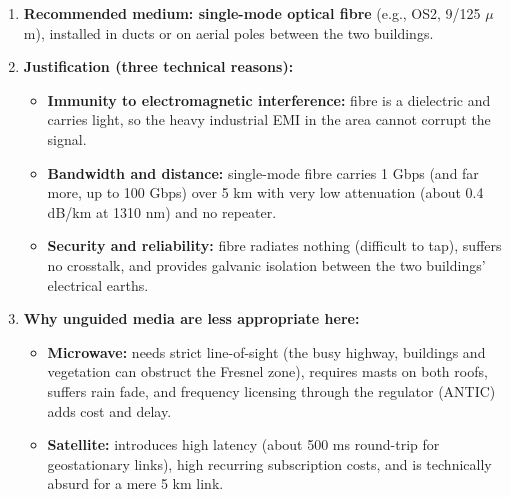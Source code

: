 \documentclass[11pt]{article}
\begin{document}
\begin{corrige}
\begin{enumerate}
\item \textbf{Recommended medium: single-mode optical fibre} (e.g., OS2, 9/125 $\mu$m), installed in ducts or on aerial poles between the two buildings.
\item \textbf{Justification (three technical reasons):}
\begin{itemize}
\item \textbf{Immunity to electromagnetic interference:} fibre is a dielectric and carries light, so the heavy industrial EMI in the area cannot corrupt the signal.
\item \textbf{Bandwidth and distance:} single-mode fibre carries 1 Gbps (and far more, up to 100 Gbps) over 5 km with very low attenuation (about 0.4 dB/km at 1310 nm) and no repeater.
\item \textbf{Security and reliability:} fibre radiates nothing (difficult to tap), suffers no crosstalk, and provides galvanic isolation between the two buildings' electrical earths.
\end{itemize}
\item \textbf{Why unguided media are less appropriate here:}
\begin{itemize}
\item \textbf{Microwave:} needs strict line-of-sight (the busy highway, buildings and vegetation can obstruct the Fresnel zone), requires masts on both roofs, suffers rain fade, and frequency licensing through the regulator (ANTIC) adds cost and delay.
\item \textbf{Satellite:} introduces high latency (about 500 ms round-trip for geostationary links), high recurring subscription costs, and is technically absurd for a mere 5 km link.
\end{itemize}
\end{enumerate}
\end{corrige}
\end{document}
